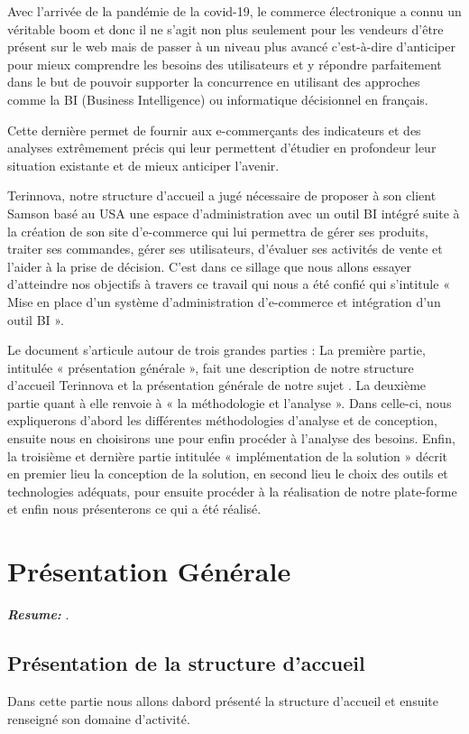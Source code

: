 \documentclass[a4paper, 12pt]{report}
\begin{document}
Avec l’arrivée de la pandémie de la covid-19, le commerce électronique a connu un véritable boom et donc il ne s’agit  non plus seulement pour les vendeurs d’être présent sur le web mais de passer à un niveau plus avancé c'est-à-dire d’anticiper pour mieux comprendre les besoins des utilisateurs et y répondre parfaitement dans le but de pouvoir supporter la concurrence en utilisant des approches comme la BI (Business Intelligence) ou informatique décisionnel en français.


Cette dernière permet de fournir aux e-commerçants des indicateurs et des analyses extrêmement précis qui leur permettent d'étudier en profondeur leur situation existante et de mieux anticiper l'avenir.


Terinnova, notre structure d’accueil a jugé nécessaire de proposer à son client Samson basé au USA une espace d’administration avec un outil BI intégré suite à la création de son site d'e-commerce qui lui permettra de gérer ses produits, traiter ses commandes, gérer ses utilisateurs, d’évaluer ses activités de vente et l’aider à la prise de décision. C’est dans ce sillage que nous allons essayer d’atteindre nos objectifs à travers ce travail qui nous a été confié qui s’intitule « Mise en place d’un système d’administration d’e-commerce et intégration d’un outil BI ».


Le document s’articule autour de trois grandes parties :
La première partie, intitulée « présentation générale », fait une description de notre structure
d’accueil Terinnova et la présentation générale de notre sujet .
La deuxième partie quant à elle renvoie à « la méthodologie et l’analyse ». Dans celle-ci,
nous expliquerons d’abord les différentes méthodologies d’analyse et de conception, ensuite
nous en choisirons une pour enfin procéder à l’analyse des besoins.
Enfin, la troisième et dernière partie intitulée « implémentation de la solution » décrit en
premier lieu la conception de la solution, en second lieu le choix des outils et technologies
adéquats, pour ensuite procéder à la réalisation de notre plate-forme et enfin nous présenterons
ce qui a été réalisé.


\chapter{Présentation Générale}
\textit{\textbf{Resume:} }.
\setcounter{minitocdepth}{2}
\minitoc
\newpage
\section{Présentation de la structure d'accueil}
Dans cette partie nous allons dabord présenté la structure d'accueil et ensuite renseigné son domaine d'activité.
\end{document}
